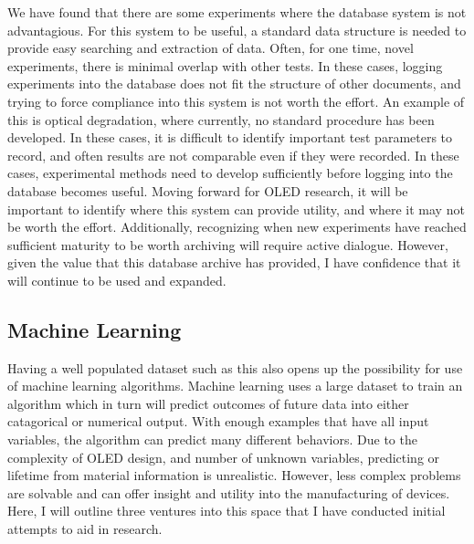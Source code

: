\documentclass[../thesis.tex]{subfiles}
\begin{document}
We have found that there are some experiments where the database system is not advantagious.
For this system to be useful, a standard data structure is needed to provide easy searching and extraction of data.  
Often, for one time, novel experiments, there is minimal overlap with other tests.  
In these cases, logging experiments into the database does not fit the structure of other documents, and trying to force compliance into this system is not worth the effort.
An example of this is optical degradation, where currently, no standard procedure has been developed.
In these cases, it is difficult to identify important test parameters to record, and often results are not comparable even if they were recorded.
In these cases, experimental methods need to develop sufficiently before logging into the database becomes useful.
Moving forward for OLED research, it will be important to identify where this system can provide utility, and where it may not be worth the effort.
Additionally, recognizing when new experiments have reached sufficient maturity to be worth archiving will require active dialogue.
However, given the value that this database archive has provided, I have confidence that it will continue to be used and expanded.

\subsection{Machine Learning}

Having a well populated dataset such as this also opens up the possibility for use of machine learning algorithms.
Machine learning uses a large dataset to train an algorithm which in turn will predict outcomes of future data into either catagorical or numerical output.
With enough examples that have all input variables, the algorithm can predict many different behaviors.
Due to the complexity of OLED design, and number of unknown variables, predicting \eqe or lifetime from material information is unrealistic.
However, less complex problems are solvable and can offer insight and utility into the manufacturing of devices.
Here, I will outline three ventures into this space that I have conducted initial attempts to aid in research.
\end{document}
